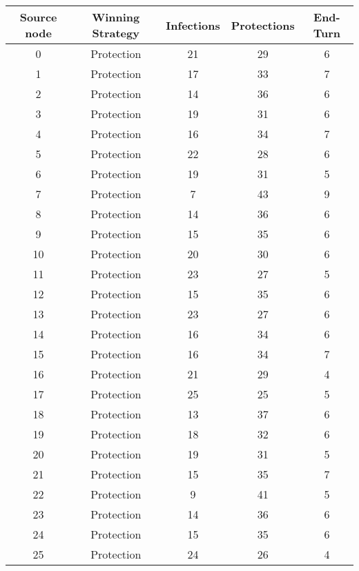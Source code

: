 \documentclass[results.tex]{subfiles}
\begin{document}
\begin{center}
  \begin{tabular}{| c || c | c | c | c |}
    \hline
    {\bfseries Source node} & {\bfseries Winning Strategy} & {\bfseries Infections} & {\bfseries Protections} & {\bfseries End-Turn} \\  %
    \hline\hline
    0 & Protection & 21 & 29 & 6 \\ 
    \hline
    1 & Protection & 17 & 33 & 7 \\ 
    \hline
    2 & Protection & 14 & 36 & 6 \\ 
    \hline
    3 & Protection & 19 & 31 & 6 \\ 
    \hline
    4 & Protection & 16 & 34 & 7 \\ 
    \hline
    5 & Protection & 22 & 28 & 6 \\ 
    \hline
    6 & Protection & 19 & 31 & 5 \\ 
    \hline
    7 & Protection & 7 & 43 & 9 \\ 
    \hline
    8 & Protection & 14 & 36 & 6 \\ 
    \hline
    9 & Protection & 15 & 35 & 6 \\ 
    \hline
    10 & Protection & 20 & 30 & 6 \\ 
    \hline
    11 & Protection & 23 & 27 & 5 \\ 
    \hline
    12 & Protection & 15 & 35 & 6 \\ 
    \hline
    13 & Protection & 23 & 27 & 6 \\ 
    \hline
    14 & Protection & 16 & 34 & 6 \\ 
    \hline
    15 & Protection & 16 & 34 & 7 \\ 
    \hline
    16 & Protection & 21 & 29 & 4 \\ 
    \hline
    17 & Protection & 25 & 25 & 5 \\ 
    \hline
    18 & Protection & 13 & 37 & 6 \\ 
    \hline
    19 & Protection & 18 & 32 & 6 \\ 
    \hline
    20 & Protection & 19 & 31 & 5 \\ 
    \hline
    21 & Protection & 15 & 35 & 7 \\ 
    \hline
    22 & Protection & 9 & 41 & 5 \\ 
    \hline
    23 & Protection & 14 & 36 & 6 \\ 
    \hline
    24 & Protection & 15 & 35 & 6 \\ 
    \hline
    25 & Protection & 24 & 26 & 4 \\ 

\end{tabular}
\end{center}
\end{document}
